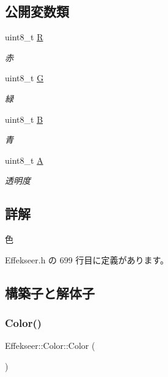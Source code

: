 \subsection*{公開変数類}
\begin{DoxyCompactItemize}
\item 
uint8\+\_\+t \mbox{\hyperlink{struct_effekseer_1_1_color_aae98e2323761b1b2b2d9d182e3af3b40}{R}}
\begin{DoxyCompactList}\small\item\em 赤 \end{DoxyCompactList}\item 
uint8\+\_\+t \mbox{\hyperlink{struct_effekseer_1_1_color_a6d82d496ac86f8ac07ec0e8710126ef9}{G}}
\begin{DoxyCompactList}\small\item\em 緑 \end{DoxyCompactList}\item 
uint8\+\_\+t \mbox{\hyperlink{struct_effekseer_1_1_color_a0313689224c549471daa2bfe58839d84}{B}}
\begin{DoxyCompactList}\small\item\em 青 \end{DoxyCompactList}\item 
uint8\+\_\+t \mbox{\hyperlink{struct_effekseer_1_1_color_a9ced071dfdca28d4da9490d24a958351}{A}}
\begin{DoxyCompactList}\small\item\em 透明度 \end{DoxyCompactList}\end{DoxyCompactItemize}


\subsection{詳解}
色 

 Effekseer.\+h の 699 行目に定義があります。



\subsection{構築子と解体子}
\mbox{\label{struct_effekseer_1_1_color_add67be00fd9bb85ad4f3bb9f6a1b755f}} 
\subsubsection{\texorpdfstring{Color()}{Color()}\hspace{0.1cm}{\footnotesize\ttfamily [1/2]}}
{\footnotesize\ttfamily Effekseer\+::\+Color\+::\+Color (\begin{DoxyParamCaption}{ }\end{DoxyParamCaption})\hspace{0.3cm}{\ttfamily [default]}}



